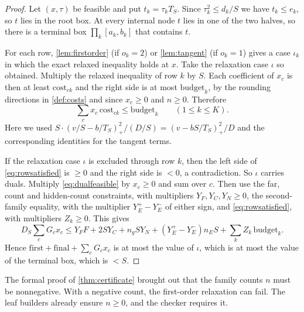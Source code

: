 \begin{proof}
Let $(x,\tau)$ be feasible and put $t_k=\tau_kT_S$. Since $\tau_k^2\le d_k/S$ we have $t_k\le e_k$,
so $t$ lies in the root box. At every internal node $t$ lies in one of the two halves, so there is
a terminal box $\prod_k[a_k,b_k]$ that contains $t$.

For each row, \cref{lem:firstorder} (if $o_k=2$) or \cref{lem:tangent} (if $o_k=1$) gives a case
$\iota_k$ in which the exact relaxed inequality holds at $x$. Take the relaxation case $\iota$ so
obtained. Multiply the relaxed inequality of row $k$ by $S$. Each coefficient of $x_c$ is then at
least $\mathrm{cost}_{ck}$ and the right side is at most $\mathrm{budget}_k$, by the rounding
directions in \cref{def:costs} and since $x_c\ge0$ and $n\ge0$. Therefore
\begin{equation}\label{eq:rowsatisfied}
  \sum_cx_c\,\mathrm{cost}_{ck}\le\mathrm{budget}_k\qquad(1\le k\le K).
\end{equation}
Here we used $S\cdot(v/S-b/T_S)_+^2/(D/S)=(v-bS/T_S)_+^2/D$ and the corresponding identities for
the tangent terms.

If the relaxation case $\iota$ is excluded through row $k$, then the left side of \eqref{eq:rowsatisfied} is $\ge0$
and the right side is $<0$, a contradiction. So $\iota$ carries duals. Multiply
\eqref{eq:dualfeasible} by $x_c\ge0$ and sum over $c$. Then use the far, count and hidden-count
constraints, with multipliers $Y_F,Y_C,Y_N\ge0$, the second-family equality, with the multiplier
$Y_E^+-Y_E^-$ of either sign, and \eqref{eq:rowsatisfied}, with multipliers $Z_k\ge0$. This gives
\[
  D_S\sum_cG_cx_c\le Y_FF+2SY_C+n_gSY_N+(Y_E^+-Y_E^-)n_ES+\sum_kZ_k\,\mathrm{budget}_k .
\]
Hence $\mathrm{first}+\mathrm{final}+\sum_cG_cx_c$ is at most the value of $\iota$, which is at most
the value of the terminal box, which is $<S$.
\end{proof}

\begin{remark}
The formal proof of \cref{thm:certificate} brought out that the family counts $n$ must be
nonnegative. With a negative count, the first-order relaxation can fail.
The leaf builders already ensure $n\ge0$, and the checker requires it.
\end{remark}
